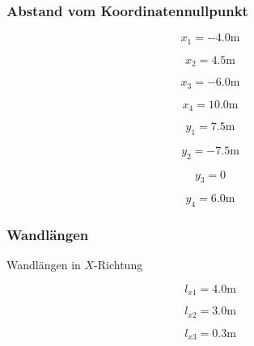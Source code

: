 \documentclass[
  letterpaper,
  DIV=11]{scrreprt}
\begin{document}
\hypertarget{abstand-vom-koordinatennullpunkt}{%
\subsubsection{Abstand vom
Koordinatennullpunkt}\label{abstand-vom-koordinatennullpunkt}}

\begin{equation*}x_{1} = - 4.0 \text{m}\end{equation*}

\begin{equation*}x_{2} = 4.5 \text{m}\end{equation*}

\begin{equation*}x_{3} = - 6.0 \text{m}\end{equation*}

\begin{equation*}x_{4} = 10.0 \text{m}\end{equation*}

\begin{equation*}y_{1} = 7.5 \text{m}\end{equation*}

\begin{equation*}y_{2} = - 7.5 \text{m}\end{equation*}

\begin{equation*}y_{3} = 0\end{equation*}

\begin{equation*}y_{4} = 6.0 \text{m}\end{equation*}

\hypertarget{wandluxe4ngen}{%
\subsubsection{Wandlängen}\label{wandluxe4ngen}}

Wandlängen in \(X\)-Richtung

\begin{equation*}l_{x1} = 4.0 \text{m}\end{equation*}

\begin{equation*}l_{x2} = 3.0 \text{m}\end{equation*}

\begin{equation*}l_{x3} = 0.3 \text{m}\end{equation*}
\end{document}
